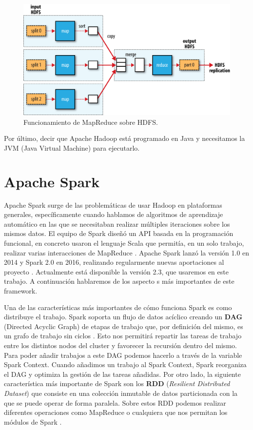\begin{figure}[htp]
\centering
\includegraphics[scale=0.28]{Imagenes/hadoop1.png}
\caption{Funcionamiento de MapReduce sobre HDFS.}
\label{hdImg1}
\end{figure}

Por último, decir que Apache Hadoop está programado en Java y necesitamos
la JVM (Java Virtual Machine) para ejecutarlo.


\section{Apache Spark\label{Spark}}

Apache Spark surge de las problemáticas de usar Hadoop en plataformas
generales, específicamente cuando hablamos de algoritmos de aprendizaje
automático en las que se necesitaban realizar múltiples iteraciones sobre
los mismos datos. El equipo de Spark diseñó un API basada en la
programación funcional, en concreto usaron el lenguaje Scala que permitía,
en un solo trabajo, realizar varias interacciones de MapReduce
\cite{Spk-1}. Apache Spark lanzó la versión 1.0 en 2014 y Spark 2.0 en
2016, realizando regularmente nuevas aportaciones al proyecto \cite{Spk-2}.
Actualmente está disponible la versión 2.3, que usaremos en este trabajo. A
continuación hablaremos de los aspecto s más importantes de este framework.

Una de las características más importantes de cómo funciona Spark es como
distribuye el trabajo. Spark soporta un flujo de datos acíclico creando un
\textbf{DAG} (Directed Acyclic Graph) de etapas de trabajo que, por
definición del mismo, es un grafo de trabajo sin ciclos \cite{Spk-5}. Esto
nos permitirá repartir las tareas de trabajo entre los distintos nodos del
cluster y favorecer la recursión dentro del mismo. Para poder añadir
trabajos a este DAG podemos hacerlo a través de la variable Spark Context.
Cuando añadimos un trabajo al Spark Context, Spark reorganiza el DAG y
optimiza la gestión de las tareas añadidas. Por otro lado, la siguiente
característica más importante de Spark son los \textbf{RDD} ({\em Resilient
  Distributed Dataset}) que consiste en una colección inmutable de datos
particionada con la que se puede operar de forma paralela. Sobre estos RDD
podemos realizar diferentes operaciones como MapReduce o cualquiera que nos
permitan los módulos de Spark \cite{Spk-4}.

